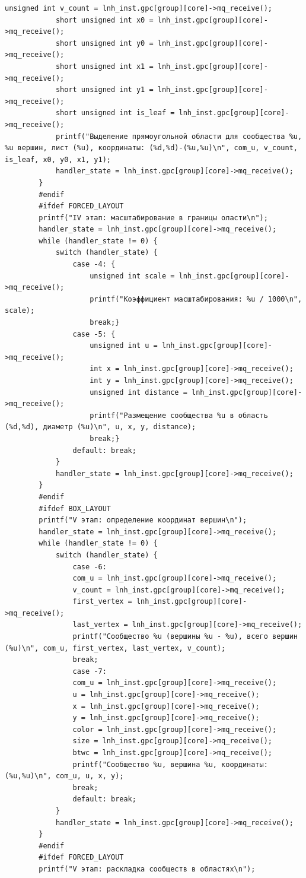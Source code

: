 \begin{lstlisting}[label=code, caption=Код чтения из файла]
			unsigned int v_count = lnh_inst.gpc[group][core]->mq_receive();
			short unsigned int x0 = lnh_inst.gpc[group][core]->mq_receive();
			short unsigned int y0 = lnh_inst.gpc[group][core]->mq_receive();
			short unsigned int x1 = lnh_inst.gpc[group][core]->mq_receive();
			short unsigned int y1 = lnh_inst.gpc[group][core]->mq_receive();
			short unsigned int is_leaf = lnh_inst.gpc[group][core]->mq_receive();
			printf("Выделение прямоугольной области для сообщества %u, %u вершин, лист (%u), координаты: (%d,%d)-(%u,%u)\n", com_u, v_count, is_leaf, x0, y0, x1, y1);
			handler_state = lnh_inst.gpc[group][core]->mq_receive();
		}
		#endif
		#ifdef FORCED_LAYOUT
		printf("IV этап: масштабирование в границы оласти\n");
		handler_state = lnh_inst.gpc[group][core]->mq_receive();
		while (handler_state != 0) {
			switch (handler_state) {
				case -4: {
					unsigned int scale = lnh_inst.gpc[group][core]->mq_receive();
					printf("Коэффициент масштабирования: %u / 1000\n", scale);
					break;}
				case -5: {
					unsigned int u = lnh_inst.gpc[group][core]->mq_receive();
					int x = lnh_inst.gpc[group][core]->mq_receive();
					int y = lnh_inst.gpc[group][core]->mq_receive();
					unsigned int distance = lnh_inst.gpc[group][core]->mq_receive();
					printf("Размещение сообщества %u в область (%d,%d), диаметр (%u)\n", u, x, y, distance);
					break;}
				default: break;
			}
			handler_state = lnh_inst.gpc[group][core]->mq_receive();
		}
		#endif
		#ifdef BOX_LAYOUT
		printf("V этап: определение координат вершин\n");
		handler_state = lnh_inst.gpc[group][core]->mq_receive();
		while (handler_state != 0) {
			switch (handler_state) {
				case -6:
				com_u = lnh_inst.gpc[group][core]->mq_receive();
				v_count = lnh_inst.gpc[group][core]->mq_receive();
				first_vertex = lnh_inst.gpc[group][core]->mq_receive();
				last_vertex = lnh_inst.gpc[group][core]->mq_receive();
				printf("Сообщество %u (вершины %u - %u), всего вершин (%u)\n", com_u, first_vertex, last_vertex, v_count);
				break;
				case -7:
				com_u = lnh_inst.gpc[group][core]->mq_receive();
				u = lnh_inst.gpc[group][core]->mq_receive();
				x = lnh_inst.gpc[group][core]->mq_receive();
				y = lnh_inst.gpc[group][core]->mq_receive();
				color = lnh_inst.gpc[group][core]->mq_receive();
				size = lnh_inst.gpc[group][core]->mq_receive();
				btwc = lnh_inst.gpc[group][core]->mq_receive();
				printf("Сообщество %u, вершина %u, координаты: (%u,%u)\n", com_u, u, x, y);
				break;
				default: break;
			}
			handler_state = lnh_inst.gpc[group][core]->mq_receive();
		}
		#endif
		#ifdef FORCED_LAYOUT
		printf("V этап: раскладка сообществ в областях\n");

\end{lstlisting}
